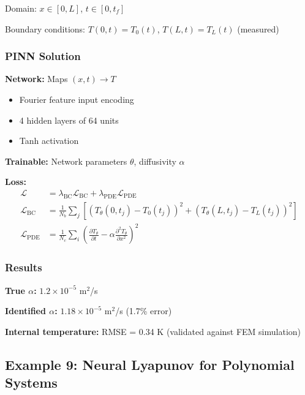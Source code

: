 Domain: $x \in [0, L]$, $t \in [0, t_f]$

Boundary conditions: $T(0, t) = T_0(t)$, $T(L, t) = T_L(t)$ (measured)

\subsubsection{PINN Solution}

\textbf{Network:} Maps $(x, t) \to T$
\begin{itemize}
    \item Fourier feature input encoding
    \item 4 hidden layers of 64 units
    \item Tanh activation
\end{itemize}

\textbf{Trainable:} Network parameters $\theta$, diffusivity $\alpha$

\textbf{Loss:}
\begin{align}
\mathcal{L} &= \lambda_{\text{BC}} \mathcal{L}_{\text{BC}} + \lambda_{\text{PDE}} \mathcal{L}_{\text{PDE}} \\
\mathcal{L}_{\text{BC}} &= \frac{1}{N_b}\sum_j \left[(T_\theta(0, t_j) - T_0(t_j))^2 + (T_\theta(L, t_j) - T_L(t_j))^2\right] \\
\mathcal{L}_{\text{PDE}} &= \frac{1}{N_c}\sum_i \left(\frac{\partial T_\theta}{\partial t} - \alpha \frac{\partial^2 T_\theta}{\partial x^2}\right)^2
\end{align}

\subsubsection{Results}

\textbf{True $\alpha$:} $1.2 \times 10^{-5}$ m$^2$/s

\textbf{Identified $\alpha$:} $1.18 \times 10^{-5}$ m$^2$/s (1.7\% error)

\textbf{Internal temperature:} RMSE = 0.34 K (validated against FEM simulation)

\subsection{Example 9: Neural Lyapunov for Polynomial Systems}
\label{ex:neural_lyapunov_polynomial}

